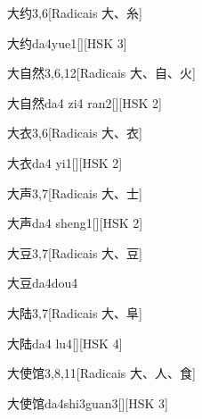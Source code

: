 \begin{entry}{大约}{3,6}[Radicais ⼤、⽷]
  \begin{phonetics}{大约}{da4yue1}[][HSK 3]
  \end{phonetics}
\end{entry}

\begin{entry}{大自然}{3,6,12}[Radicais ⼤、⾃、⽕]
  \begin{phonetics}{大自然}{da4 zi4 ran2}[][HSK 2]
  \end{phonetics}
\end{entry}

\begin{entry}{大衣}{3,6}[Radicais ⼤、⾐]
  \begin{phonetics}{大衣}{da4 yi1}[][HSK 2]
  \end{phonetics}
\end{entry}

\begin{entry}{大声}{3,7}[Radicais ⼤、⼠]
  \begin{phonetics}{大声}{da4 sheng1}[][HSK 2]
  \end{phonetics}
\end{entry}

\begin{entry}{大豆}{3,7}[Radicais ⼤、⾖]
  \begin{phonetics}{大豆}{da4dou4}
  \end{phonetics}
\end{entry}

\begin{entry}{大陆}{3,7}[Radicais ⼤、⾩]
  \begin{phonetics}{大陆}{da4 lu4}[][HSK 4]
  \end{phonetics}
\end{entry}

\begin{entry}{大使馆}{3,8,11}[Radicais ⼤、⼈、⾷]
  \begin{phonetics}{大使馆}{da4shi3guan3}[][HSK 3]
  \end{phonetics}
\end{entry}


